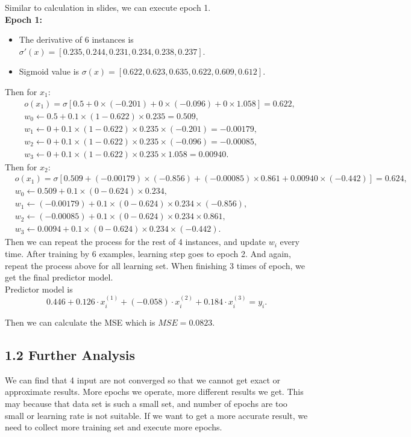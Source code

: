 \documentclass{article}
\begin{document}
Similar to calculation in slides, we can execute epoch 1.\\
\textbf{Epoch 1:}
\begin{itemize}
    \item The derivative of 6 instances is $\sigma'(x)=[0.235,0.244,0.231,0.234,0.238,0.237]$.
    \item Sigmoid value is $\sigma(x)=[0.622,0.623,0.635,0.622,0.609,0.612]$.
\end{itemize}
Then for $x_1$:
\begin{align*}
    &o(x_1)=\sigma[0.5+0\times (-0.201)+0\times (-0.096)+0\times 1.058]=0.622,\\
    &w_0 \leftarrow 0.5+0.1\times (1-0.622)\times 0.235= 0.509,\\
    &w_1 \leftarrow 0+0.1\times (1-0.622)\times 0.235\times (-0.201) = -0.00179,\\
    &w_2 \leftarrow 0+0.1\times (1-0.622)\times 0.235\times (-0.096) = -0.00085,\\
    &w_3 \leftarrow 0+0.1\times (1-0.622)\times 0.235\times 1.058 = 0.00940.
\end{align*}
Then for $x_2$:
\begin{align*}
    &o(x_1)=\sigma[0.509+(-0.00179)\times (-0.856)+(-0.00085)\times 0.861+0.00940\times (-0.442)]=0.624,\\
    &w_0 \leftarrow 0.509+0.1\times (0-0.624)\times 0.234,\\
    &w_1 \leftarrow (-0.00179)+0.1\times (0-0.624)\times 0.234\times (-0.856),\\
    &w_2 \leftarrow (-0.00085)+0.1\times (0-0.624)\times 0.234\times 0.861,\\
    &w_3 \leftarrow 0.0094+0.1\times (0-0.624)\times 0.234\times (-0.442).
\end{align*}
Then we can repeat the process for the rest of 4 instances, and update $w_i$ every time.
After training by 6 examples, learning step goes to epoch 2.
And again, repeat the process above for all learning set.
When finishing 3 times of epoch, we get the final predictor model.\\
Predictor model is \[0.446+0.126\cdot x_i^{(1)}+(-0.058)\cdot x_i^{(2)}+0.184\cdot x_i^{(3)}=y_i.\]

Then we can calculate the MSE which is $MSE=0.0823$.

\subsection*{1.2 Further Analysis}
We can find that 4 input are not converged so that we cannot get exact or approximate results.
More epochs we operate, more different results we get.
This may because that data set is such a small set, and number of epochs are too small or learning rate is not suitable.
If we want to get a more accurate result, we need to collect more training set and execute more epochs.
\end{document}
